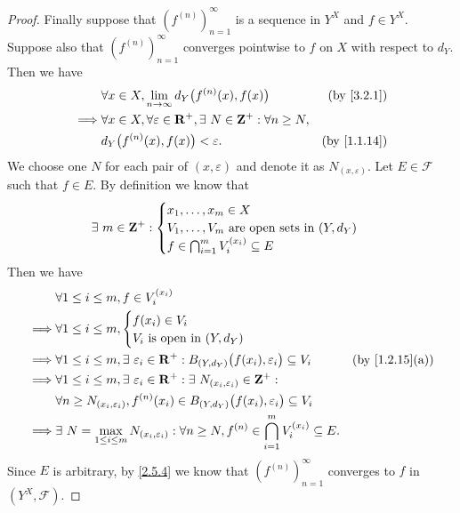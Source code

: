 \begin{proof}
  Finally suppose that \((f^{(n)})_{n = 1}^\infty\) is a sequence in \(Y^X\) and \(f \in Y^X\).
  Suppose also that \((f^{(n)})_{n = 1}^\infty\) converges pointwise to \(f\) on \(X\) with respect to \(d_Y\).
  Then we have
  \begin{align*}
             & \forall x \in X, \lim_{n \to \infty} d_Y\big(f^{(n)}(x), f(x)\big)                     & \text{(by \cref{3.2.1})}  \\
    \implies & \forall x \in X, \forall \varepsilon \in \R^+, \exists\ N \in \Z^+ : \forall n \geq N,                             \\
             & d_Y\big(f^{(n)}(x), f(x)\big) < \varepsilon.                                           & \text{(by \cref{1.1.14})}
  \end{align*}
  We choose one \(N\) for each pair of \((x, \varepsilon)\) and denote it as \(N_{(x, \varepsilon)}\).
  Let \(E \in \mathcal{F}\) such that \(f \in E\).
  By definition we know that
  \[
    \exists\ m \in \mathbf{Z}^+ : \begin{cases}
      x_1, \dots, x_m \in X                              \\
      V_1, \dots, V_m \text{ are open sets in } (Y, d_Y) \\
      f \in \bigcap_{i = 1}^m V_i^{(x_i)} \subseteq E
    \end{cases}
  \]
  Then we have
  \begin{align*}
             & \forall 1 \leq i \leq m, f \in V_i^{(x_i)}                                                                                                                             \\
    \implies & \forall 1 \leq i \leq m, \begin{cases}
                                          f(x_i) \in V_i \\
                                          V_i \text{ is open in } (Y, d_Y)
                                        \end{cases}                                                                                                               \\
    \implies & \forall 1 \leq i \leq m, \exists\ \varepsilon_i \in \R^+ : B_{(Y, d_Y)}\big(f(x_i), \varepsilon_i\big) \subseteq V_i                    & \text{(by \cref{1.2.15}(a))} \\
    \implies & \forall 1 \leq i \leq m, \exists\ \varepsilon_i \in \R^+ : \exists\ N_{(x_i, \varepsilon_i)} \in \Z^+ :                                                                \\
             & \forall n \geq N_{(x_i, \varepsilon_i)}, f^{(n)}(x_i) \in B_{(Y, d_Y)}\big(f(x_i), \varepsilon_i\big) \subseteq V_i                                                    \\
    \implies & \exists\ N = \max_{1 \leq i \leq m} N_{(x_i, \varepsilon_i)} : \forall n \geq N, f^{(n)} \in \bigcap_{i = 1}^m V_i^{(x_i)} \subseteq E.
  \end{align*}
  Since \(E\) is arbitrary, by \cref{2.5.4} we know that \((f^{(n)})_{n = 1}^\infty\) converges to \(f\) in \((Y^X, \mathcal{F})\).
\end{proof}